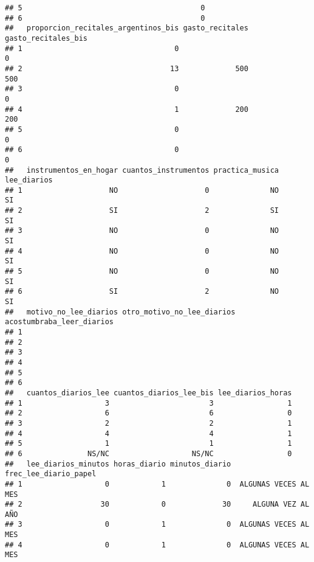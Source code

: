 \documentclass[
]{article}
\begin{document}
\begin{verbatim}
## 5                                         0                                
## 6                                         0                                
##   proporcion_recitales_argentinos_bis gasto_recitales gasto_recitales_bis
## 1                                   0                                   0
## 2                                  13             500                 500
## 3                                   0                                   0
## 4                                   1             200                 200
## 5                                   0                                   0
## 6                                   0                                   0
##   instrumentos_en_hogar cuantos_instrumentos practica_musica lee_diarios
## 1                    NO                    0              NO          SI
## 2                    SI                    2              SI          SI
## 3                    NO                    0              NO          SI
## 4                    NO                    0              NO          SI
## 5                    NO                    0              NO          SI
## 6                    SI                    2              NO          SI
##   motivo_no_lee_diarios otro_motivo_no_lee_diarios acostumbraba_leer_diarios
## 1                                                                           
## 2                                                                           
## 3                                                                           
## 4                                                                           
## 5                                                                           
## 6                                                                           
##   cuantos_diarios_lee cuantos_diarios_lee_bis lee_diarios_horas
## 1                   3                       3                 1
## 2                   6                       6                 0
## 3                   2                       2                 1
## 4                   4                       4                 1
## 5                   1                       1                 1
## 6               NS/NC                   NS/NC                 0
##   lee_diarios_minutos horas_diario minutos_diario frec_lee_diario_papel
## 1                   0            1              0  ALGUNAS VECES AL MES
## 2                  30            0             30     ALGUNA VEZ AL AÑO
## 3                   0            1              0  ALGUNAS VECES AL MES
## 4                   0            1              0  ALGUNAS VECES AL MES

\end{verbatim}
\end{document}
